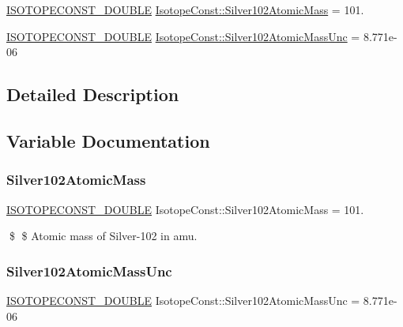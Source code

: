 \begin{DoxyCompactItemize}
\item 
\mbox{\hyperlink{group___isotope_const-_macros_ga8f45a7272ce02c0b4c65c44636ed719a}{I\+S\+O\+T\+O\+P\+E\+C\+O\+N\+S\+T\+\_\+\+D\+O\+U\+B\+LE}} \mbox{\hyperlink{group___isotope_const-_silver-_ag102_ga4a7d8d2235bff3caee4c74892b704352}{Isotope\+Const\+::\+Silver102\+Atomic\+Mass}} = 101.
\item 
\mbox{\hyperlink{group___isotope_const-_macros_ga8f45a7272ce02c0b4c65c44636ed719a}{I\+S\+O\+T\+O\+P\+E\+C\+O\+N\+S\+T\+\_\+\+D\+O\+U\+B\+LE}} \mbox{\hyperlink{group___isotope_const-_silver-_ag102_gacb0d34468fd9f6d7d610e839dff1e214}{Isotope\+Const\+::\+Silver102\+Atomic\+Mass\+Unc}} = 8.\+771e-\/06
\end{DoxyCompactItemize}


\subsection{Detailed Description}


\subsection{Variable Documentation}
\mbox{\label{group___isotope_const-_silver-_ag102_ga4a7d8d2235bff3caee4c74892b704352}} 
\subsubsection{\texorpdfstring{Silver102\+Atomic\+Mass}{Silver102AtomicMass}}
{\footnotesize\ttfamily \mbox{\hyperlink{group___isotope_const-_macros_ga8f45a7272ce02c0b4c65c44636ed719a}{I\+S\+O\+T\+O\+P\+E\+C\+O\+N\+S\+T\+\_\+\+D\+O\+U\+B\+LE}} Isotope\+Const\+::\+Silver102\+Atomic\+Mass = 101.}

\$ \$ Atomic mass of Silver-\/102 in amu. \mbox{\label{group___isotope_const-_silver-_ag102_gacb0d34468fd9f6d7d610e839dff1e214}} 
\subsubsection{\texorpdfstring{Silver102\+Atomic\+Mass\+Unc}{Silver102AtomicMassUnc}}
{\footnotesize\ttfamily \mbox{\hyperlink{group___isotope_const-_macros_ga8f45a7272ce02c0b4c65c44636ed719a}{I\+S\+O\+T\+O\+P\+E\+C\+O\+N\+S\+T\+\_\+\+D\+O\+U\+B\+LE}} Isotope\+Const\+::\+Silver102\+Atomic\+Mass\+Unc = 8.\+771e-\/06}

